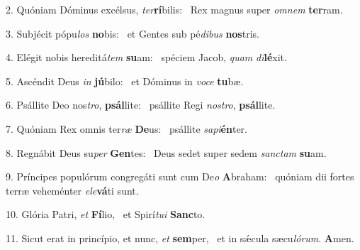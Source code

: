 2. Quóniam Dóminus excélsus, \textit{ter}\textbf{rí}bilis: \ast\  Rex magnus super \textit{om}\textit{nem} \textbf{ter}ram.\

3. Subjécit pópu\textit{los} \textbf{no}bis: \ast\  et Gentes sub pé\textit{di}\textit{bus} \textbf{nos}tris.\

4. Elégit nobis hereditá\textit{tem} \textbf{su}am: \ast\  spéciem Jacob, \textit{quam} \textit{di}\textbf{lé}xit.\

5. Ascéndit Deus \textit{in} \textbf{jú}bilo: \ast\  et Dóminus in \textit{vo}\textit{ce} \textbf{tu}bæ.\

6. Psállite Deo nos\textit{tro}, \textbf{psál}lite: \ast\  psállite Regi \textit{nos}\textit{tro}, \textbf{psál}lite.\

7. Quóniam Rex omnis ter\textit{ræ} \textbf{De}us: \ast\  psállite \textit{sa}\textit{pi}\textbf{én}ter.\

8. Regnábit Deus su\textit{per} \textbf{Gen}tes: \ast\  Deus sedet super sedem \textit{sanc}\textit{tam} \textbf{su}am.\

9. Príncipes populórum congregáti sunt cum De\textit{o} \textbf{A}braham: \ast\  quóniam dii fortes terræ veheménter \textit{e}\textit{le}\textbf{vá}ti sunt.\

10. Glória Patri, \textit{et} \textbf{Fí}lio, \ast\  et Spirí\textit{tu}\textit{i} \textbf{Sanc}to.\

11. Sicut erat in princípio, et nunc, \textit{et} \textbf{sem}per, \ast\  et in sǽcula sæcu\textit{ló}\textit{rum}. \textbf{A}men.\

